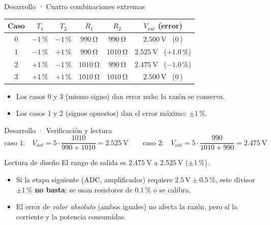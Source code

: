 \documentclass[aspectratio=169]{beamer}
\begin{document}
\begin{frame}{Desarrollo · Cuatro combinaciones extremas}
  \begin{table}
    \small
    \begin{tabular}{cccccc}
      \toprule
      Caso & $T_1$ & $T_2$ & $R_1$ & $R_2$ & $V_{out}$ (error) \\
      \midrule
      0 & $-1\,\text{\%}$ & $-1\,\text{\%}$ & $\SI{990}{\ohm}$  & $\SI{990}{\ohm}$  & $\SI{2.500}{\volt}$ \ (0\,\text{\%}) \\
      1 & $-1\,\text{\%}$ & $+1\,\text{\%}$ & $\SI{990}{\ohm}$  & $\SI{1010}{\ohm}$ & $\SI{2.525}{\volt}$ \ ($+1.0\,\text{\%}$) \\
      2 & $+1\,\text{\%}$ & $-1\,\text{\%}$ & $\SI{1010}{\ohm}$ & $\SI{990}{\ohm}$  & $\SI{2.475}{\volt}$ \ ($-1.0\,\text{\%}$) \\
      3 & $+1\,\text{\%}$ & $+1\,\text{\%}$ & $\SI{1010}{\ohm}$ & $\SI{1010}{\ohm}$ & $\SI{2.500}{\volt}$ \ (0\,\text{\%}) \\
      \bottomrule
    \end{tabular}
  \end{table}
  \pause
  \begin{itemize}
    \item Los casos 0 y 3 (mismo signo) dan error nulo: la razón se conserva.
    \item Los casos 1 y 2 (signos opuestos) dan el error máximo: $\pm 1\,\text{\%}$.
  \end{itemize}
\end{frame}

\begin{frame}{Desarrollo · Verificación y lectura}
  \[
    \text{caso 1:}\quad V_{out} = 5\cdot\frac{1010}{990+1010} = \SI{2.525}{\volt}
    \qquad
    \text{caso 2:}\quad V_{out} = 5\cdot\frac{990}{1010+990} = \SI{2.475}{\volt}
  \]
  \pause
  \begin{block}{Lectura de diseño}
    El rango de salida es $\SI{2.475}{\volt}$ a $\SI{2.525}{\volt}$ ($\pm 1\,\text{\%}$).
    \begin{itemize}
      \item Si la etapa siguiente (ADC, amplificador) requiere $2.5\,\text{V}\pm 0.5\,\text{\%}$, este
        divisor $\pm 1\,\text{\%}$ \textbf{no basta}: se usan resistores de $0.1\,\text{\%}$ o se calibra.
      \item El error de \emph{valor absoluto} (ambos iguales) no afecta la razón, pero sí la
        corriente y la potencia consumidas.
    \end{itemize}
  \end{block}
\end{frame}
\end{document}
